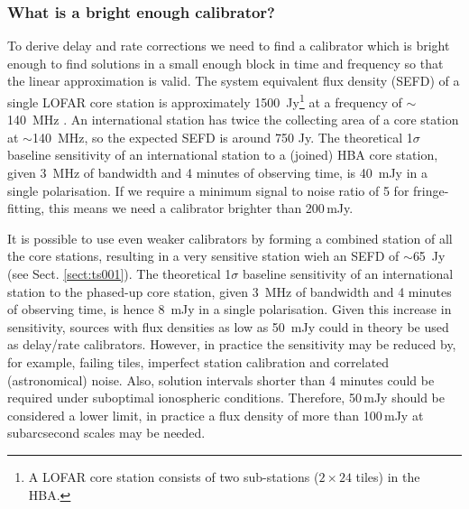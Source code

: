 \documentclass[graybox]{svmult}
\begin{document}
\subsubsection{What is a bright enough calibrator?}
\label{sect:brightcal}
To derive delay and rate corrections we need to find a calibrator which is
bright enough to find solutions in a small enough block in time and frequency
so that the linear approximation is valid. 
The system equivalent flux density (SEFD) of a single LOFAR core station is
approximately 1500~Jy\footnote{A LOFAR core station consists of two
sub-stations ($2\times24$ tiles) in the HBA.} at a frequency of $\sim$140~MHz
\citep{vanhaarlem13}.  An international station has twice the collecting area
of a core station at $\sim$140~MHz, so the expected SEFD is around 750 Jy.  
The theoretical 1$\sigma$ baseline sensitivity of an international
station to a (joined) HBA core station, given 3~MHz of bandwidth and 4 minutes
of observing time, is 40~mJy in a single polarisation.  
If we require a minimum signal to noise ratio of 5 for fringe-fitting,
this means we need a calibrator brighter than 200\,mJy.

It is possible to use even weaker calibrators by forming a combined station of
all the core stations, resulting in a very sensitive station wieh an SEFD of
$\sim$65~Jy (see Sect. \ref{sect:ts001}).  The theoretical 1$\sigma$ baseline
sensitivity of an international station to the phased-up core station, given
3~MHz of bandwidth and 4 minutes of observing time, is hence 8~mJy in a single
polarisation.  Given this increase in sensitivity, sources with flux densities
as low as 50~mJy could in theory be used as delay/rate calibrators. 
However, in practice the sensitivity may be reduced by, for example, failing
tiles, imperfect station calibration and correlated (astronomical) noise. Also,
solution intervals shorter than 4 minutes could be required under suboptimal
ionospheric conditions. Therefore, 50\,mJy should be considered a lower limit,
in practice a flux density of more than 100\,mJy at subarcsecond scales may be
needed.
\end{document}
